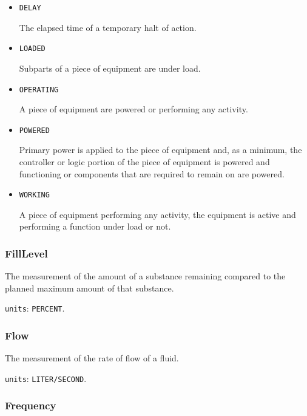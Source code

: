 \begin{itemize}

\item \texttt{DELAY}


The elapsed time of a temporary halt of action.

\item \texttt{LOADED}


Subparts of a piece of equipment are under load.

\item \texttt{OPERATING}


A piece of equipment are powered or performing any activity.

\item \texttt{POWERED}


Primary  power is  applied  to the  piece  of  equipment and,  as  a minimum, the controller or logic portion of the piece of equipment is powered and functioning or components that are required to remain on are powered.

\item \texttt{WORKING}


A piece of equipment performing any activity, the equipment is active and performing a function under load or not.


\end{itemize}








\subsubsection{FillLevel}
\label{sec:FillLevel}



The measurement of the amount of a substance remaining compared to the planned maximum amount of that substance.


\texttt{units}: \texttt{PERCENT}.


\subsubsection{Flow}
\label{sec:Flow}



The measurement of the rate of flow of a fluid.


\texttt{units}: \texttt{LITER/SECOND}.


\subsubsection{Frequency}
\label{sec:Frequency}



